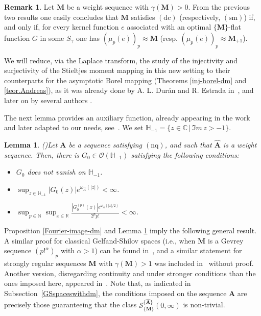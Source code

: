 \documentclass[12pt,a4paper]{article}
\newcommand{\N}{\mathbb{N}}
\newcommand{\R}{\mathbb{R}}
\newcommand{\C}{\mathbb{C}}
\newcommand{\HH}{\mathbb{H}}
\newcommand{\M}{{\boldsymbol{M}}}
\newcommand{\A}{{\boldsymbol{A}}}
\newcommand{\hA}{\widehat{{\boldsymbol{A}}}}
\newcommand{\dc}{\operatorname{(dc)}}
\newcommand{\nq}{\operatorname{(nq)}}
\newcommand{\sm}{\operatorname{(sm)}}
\newcommand{\om}{\omega}
\newcommand{\ga}{\gamma}
\theoremstyle{plain}
\newtheorem{lemma}[theorem]{Lemma}
\theoremstyle{definition}
\newtheorem{remark}[theorem]{Remark}
\numberwithin{equation}{section}
\begin{document}
\begin{remark}
Let $\M$ be a weight sequence with $\ga(\M)>0$. From the previous two results one easily concludes that $\M$ satisfies $\dc$ (respectively, $\sm$) if, and only if, for every kernel function $e$ associated with an optimal $\{\M\}$-flat function $G$ in some $S_\ga$ one has $(\mu_p(e))_p\approx \M$ (resp. $(\mu_p(e))_p\approx \M_{+1}$).
\end{remark}

We will reduce, via the Laplace transform, the study of the injectivity and surjectivity of the Stieltjes moment mapping in this new setting to their counterparts for the asymptotic Borel mapping (Theorems \ref{inj-borel-dm} and
\ref{teor.Andreas}), as it was already done by A. L. Dur\'an and R. Estrada in~\cite{D-E}, and later on by several authors \cite{C-C-K, L-S08,L-S09,DebrouwereetalMoment}.

The next lemma provides an auxiliary function, already appearing in the work \cite{D-E} and later adapted to our needs, see~\cite{DebrouwereetalMoment}. We set $\HH_{-1} = \{ z \in \C \, | \, \Im m \, z > -1 \}$.

\begin{lemma}(\cite[Lemma 3.1]{DebrouwereetalMoment})\label{aux-dm} Let $\A$ be a sequence satisfying $\nq$, and such that $\hA$ is a weight sequence. Then, there is $G_0 \in \mathcal{O}(\HH_{-1})$ satisfying the following conditions:
\begin{itemize}
\item[$(i)$] $G_0$ does not vanish on $\HH_{-1}$.
\item[$(ii)$] $\displaystyle \sup_{z \in \HH_{-1}} |G_0(z)|e^{\om_{\widehat{A}}(|z|)} < \infty$.
\item[$(iii)$] $\displaystyle \sup_{p \in \N}\sup_{x \in \R} \frac{|G_0^{(p)}(x)|e^{\om_{\widehat{A}}(|x|/2)}}{2^pp!} < \infty$.
\end{itemize}
\end{lemma}

Proposition \ref{Fourier-image-dm} and Lemma \ref{aux-dm} imply the following general result. A similar proof for classical Gelfand-Shilov spaces (i.e., when $\M$ is a Gevrey sequence $(p!^\alpha)_p$ with $\alpha>1$) can be found in~\cite[Prop. 4.13]{L-S08}, and a similar statement for strongly regular sequences $\M$ with $\ga(\M)>1$ was included in~\cite[Prop. 6.6]{L-S09} without proof. Another version, disregarding continuity and under stronger conditions than the ones imposed here, appeared in~\cite[Lemma 3.3]{DebrouwereetalMoment}. Note that, as indicated in Subsection~\ref{GSspaceswithdm}, the conditions imposed on the sequence $\A$ are precisely those guaranteeing that the class $\mathcal{S}^{\{\hA\}}_{\{\M\}}(0,\infty)$ is non-trivial.
\end{document}
